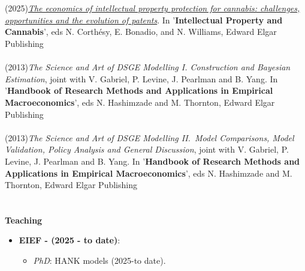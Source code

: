 \documentclass[margin, 11pt]{res} %
\begin{document}
\begin{resume}
\section{}
(2025)\emph{\href{https://www.elgaronline.com/edcollchap/book/9781035329397/chapter13.xml}{The economics of intellectual property protection for cannabis: challenges, opportunities and the evolution of patents}}.  In  '\textbf{Intellectual Property and Cannabis}', eds N. Corthésy, E. Bonadio, and N. Williams,  Edward Elgar Publishing\\
\\
(2013)\emph{The Science and  Art of DSGE Modelling I. Construction and Bayesian Estimation}, joint with V. Gabriel,  P. Levine, J. Pearlman and B. Yang.   In  '\textbf{Handbook of Research Methods and Applications in Empirical Macroeconomics}', eds N. Hashimzade and M. Thornton,  Edward Elgar Publishing\\
\\
(2013)\emph{The Science and  Art of DSGE Modelling  II.~Model Comparisons, Model Validation, Policy Analysis and General Discussion}, joint with V. Gabriel,  P. Levine, J. Pearlman and B. Yang. In  '\textbf{Handbook of Research Methods and Applications in Empirical Macroeconomics}', eds N. Hashimzade and M. Thornton,  Edward Elgar Publishing









\section{}

\textbf{Teaching}

\begin{itemize}
    \item \textbf{EIEF - (2025 - to date)}:
    \begin{itemize}
        \item \emph{PhD}: HANK models (2025-to date).
    \end{itemize}


\end{itemize}
\end{resume}
\end{document}
